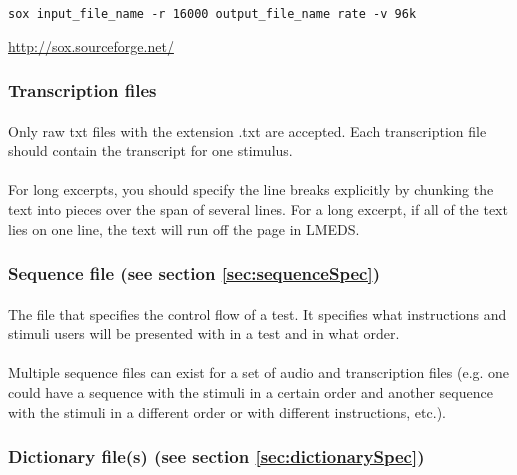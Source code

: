 \begin{lstlisting}
sox input_file_name -r 16000 output_file_name rate -v 96k
\end{lstlisting}

\url{http://sox.sourceforge.net/}


\subsubsection{Transcription files}

\paragraph{}
Only raw txt files with the extension .txt are accepted.  Each transcription file should contain the transcript for one stimulus.

\paragraph{}
For long excerpts, you should specify the line breaks explicitly by chunking the text into pieces over the span of several lines.  For a long excerpt, if all of the text lies on one line, the text will run off the page in LMEDS.


\subsubsection{Sequence file (see section \ref{sec:sequenceSpec})}

\paragraph{}
The file that specifies the control flow of a test.  It specifies what instructions and stimuli users will be presented with in a test and in what order. 

\paragraph{}
Multiple sequence files can exist for a set of audio and transcription files (e.g. one could have a sequence with the stimuli in a certain order and another sequence with the stimuli in a different order or with different instructions, etc.).


\subsubsection{Dictionary file(s) (see section \ref{sec:dictionarySpec})}

